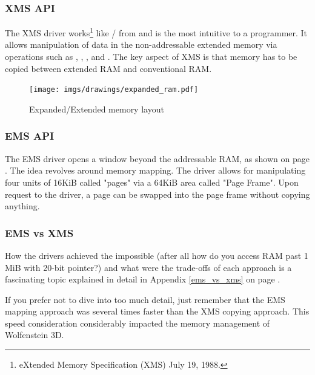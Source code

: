 \documentclass[book.tex]{subfiles}
\begin{document}
\subsubsection{XMS API}
The XMS driver works\footnote{eXtended Memory Specification (XMS) July 19, 1988.} like / from  and is the most intuitive to a programmer. It allows manipulation of data in the non-addressable extended memory via operations such as , , , and . The key aspect of XMS is that memory has to be copied between extended RAM and conventional RAM.\\
\par


\begin{figure}[H]
\centering
\texttt{[image: imgs/drawings/expanded\_ram.pdf]}
\caption{Expanded/Extended memory layout}
\label{fig:ems_xms_layout}
\end{figure}





\subsubsection{EMS API}
The EMS driver opens a window beyond the addressable RAM, as shown on page \pageref{fig:ems_xms_layout}. The idea revolves around memory mapping. The driver allows for manipulating four units of 16KiB called "pages" via a 64KiB area called "Page Frame". Upon request to the driver, a page can be swapped into the page frame without copying anything.\\
\par


\subsubsection{EMS vs XMS}
How the drivers achieved the impossible (after all how do you access RAM past 1 MiB with 20-bit pointer?) and what were the trade-offs of each approach is a fascinating topic explained in detail in Appendix \ref{ems_vs_xms} on page \pageref{ems_vs_xms}.\\
\par
 If you prefer not to dive into too much detail, just remember that the EMS mapping approach was several times faster than the XMS copying approach. This speed consideration considerably impacted the memory management of Wolfenstein 3D.
\end{document}
